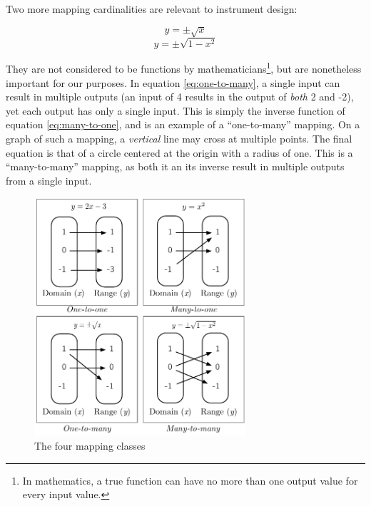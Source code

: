 Two more mapping cardinalities are relevant to instrument design:  

\begin{equation} y = \pm\sqrt{x} \label{eq:one-to-many} \end{equation} 
\begin{equation} y = \pm\sqrt{1 - x^2} \label{eq:many-to-many} \end{equation} 

They are not considered to be functions by mathematicians\footnote{In mathematics, a true function can have no more than one output value for every input value.}, but are nonetheless important for our purposes. In equation \ref{eq:one-to-many}, a single input can result in multiple outputs (an input of 4 results in the output of \emph{both} 2 and -2), yet each output has only a single input. This is simply the inverse function of equation \ref{eq:many-to-one}, and is an example of a ``one-to-many'' mapping. On a graph of such a mapping, a \emph{vertical} line may cross at multiple points. The final equation is that of a circle centered at the origin with a radius of one. This is a ``many-to-many'' mapping, as both it an its inverse result in multiple outputs from a single input.


\begin{figure}[h]
\centering
	\includegraphics[width=0.7\textwidth]{figures/types_of_mapping}
\caption{The four mapping classes}
\label{fig:types_of_mapping}
\end{figure}

